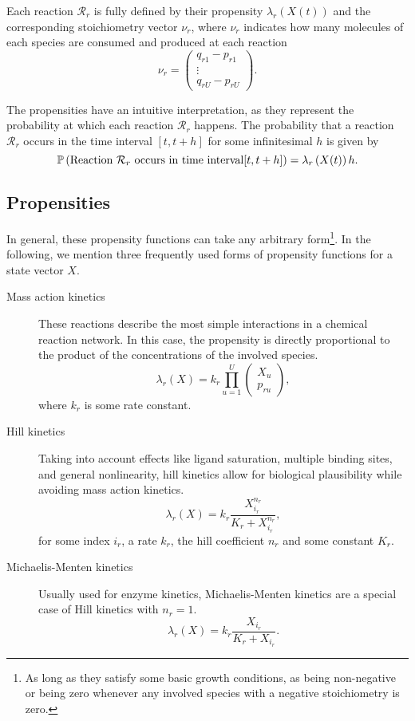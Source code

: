 \documentclass[11pt]{article} %
\begin{document}
Each reaction $\mathcal{R}_r$ is fully defined by their propensity $\lambda_r\left(X(t)\right)$ and the corresponding stoichiometry vector $\nu_r$, where $\nu_r$ indicates how many molecules of each species are consumed and produced at each reaction
$$\nu_{r}= \left( \begin{array}{c} q_{r1} - p_{r1} \\ \vdots \\  q_{rU} - p_{rU}\end{array}\right).$$

The propensities have an intuitive interpretation, as they represent the probability at which each reaction $\mathcal{R}_r$ happens. 
The probability that a reaction $\mathcal{R}_r$ occurs in the time interval $[t, t + h]$ for some infinitesimal $h$ is given by 
$$\mathbb{P}\left(\textnormal{Reaction }\mathcal{R}_r\textnormal{ occurs in time interval} [t, t+h]\right) = \lambda_r\left(X(t)\right)h.$$

\subsection{Propensities}
In general, these propensity functions can take any arbitrary form\footnote{As long as they satisfy some basic growth conditions, as being non-negative or being zero whenever any involved species with a negative stoichiometry is zero. }. In the following, we mention three frequently used forms of propensity functions for a state vector $X$. 

\begin{description}
\item[Mass action kinetics] These reactions describe the most simple interactions in a chemical reaction network. In this case, the propensity is directly proportional to the product of the concentrations of the involved species.
$$\lambda_r\left(X\right) = k_r\prod_{u = 1}^U\left(\begin{array}{c} X_u \\ p_{ru}\end{array}\right),$$
where $k_r$ is some rate constant.
\item[Hill kinetics]
Taking into account effects like ligand saturation, multiple binding sites, and general nonlinearity, hill kinetics allow for biological plausibility while avoiding mass action kinetics.
$$\lambda_r\left(X\right) =k_r\frac{X_{i_r}^{n_r}}{K_r + X_{i_r}^{n_r} },$$
for some index $i_r$, a rate $k_r$, the hill coefficient $n_r$ and some constant $K_r$. 
\item[Michaelis-Menten kinetics]
Usually used for enzyme kinetics, Michaelis-Menten kinetics are a special case of Hill kinetics with $n_r= 1$.
$$\lambda_r\left(X\right) =k_r\frac{X_{i_r}}{K_r + X_{i_r} }.$$
\end{description}
\end{document}
